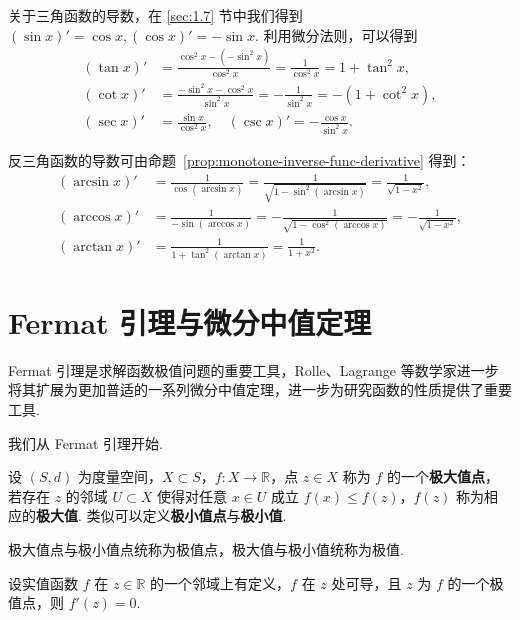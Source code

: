 \documentclass[../main.tex]{subfiles}
\begin{document}
关于三角函数的导数，在 \ref{sec:1.7} 节中我们得到 $(\sin x)' = \cos x, (\cos x)' = -\sin x$. 利用微分法则，可以得到
\begin{align*}
    (\tan x)' &= \frac{\cos^2 x - (-\sin^2 x)}{\cos^2 x} = \frac{1}{\cos^2 x} = 1 + \tan^2 x, \\
    (\cot x)' &= \frac{-\sin^2 x - \cos^2 x}{\sin^2 x} = -\frac{1}{\sin^2 x} = -(1 + \cot^2 x), \\
    (\sec x)' &= \frac{\sin x}{\cos^2 x},\quad (\csc x)' = -\frac{\cos x}{\sin^2 x}. 
\end{align*}

反三角函数的导数可由命题~\ref{prop:monotone-inverse-func-derivative} 得到：
\begin{align*}
    (\arcsin x)' &= \frac{1}{\cos(\arcsin x)} = \frac{1}{\sqrt{1 - \sin^2(\arcsin x)}} = \frac{1}{\sqrt{1 - x^2}}, \\
    (\arccos x)' &= \frac{1}{-\sin(\arccos x)} = -\frac{1}{\sqrt{1 - \cos^2(\arccos x)}} = -\frac{1}{\sqrt{1 - x^2}}, \\
    (\arctan x)' &= \frac{1}{1 + \tan^2(\arctan x)} = \frac{1}{1 + x^2}. 
\end{align*}


\section{Fermat 引理与微分中值定理}

Fermat 引理是求解函数极值问题的重要工具，Rolle、Lagrange 等数学家进一步将其扩展为更加普适的一系列微分中值定理，进一步为研究函数的性质提供了重要工具. 

我们从 Fermat 引理开始. 

\begin{definition}[函数极值的定义] \label{def:local_extremum}  
    设 $(S, d)$ 为度量空间，$X \subset S$，$f:X \to \mathbb R$，点 $z \in X$ 称为 $f$ 的一个\textbf{极大值点}，若存在 $z$ 的邻域 $U \subset X$ 使得对任意 $x \in U$ 成立 $f(x) \leqslant f(z)$，$f(z)$ 称为相应的\textbf{极大值}. 类似可以定义\textbf{极小值点}与\textbf{极小值}. 
\end{definition}

\begin{remark}
    极大值点与极小值点统称为极值点，极大值与极小值统称为极值. 
\end{remark}

\begin{theorem}[Fermat 引理] 
    设实值函数 $f$ 在 $z \in \mathbb R$ 的一个邻域上有定义，$f$ 在 $z$ 处可导，且 $z$ 为 $f$ 的一个极值点，则 $f'(z) = 0$. 
\end{theorem}
\end{document}
